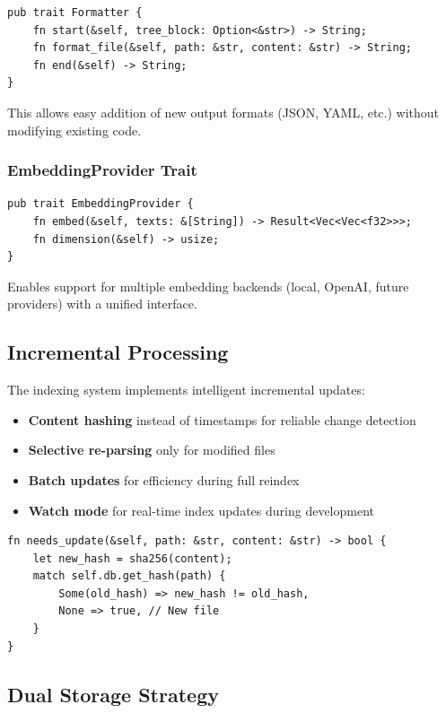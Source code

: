 \begin{lstlisting}[style=rustcode]
pub trait Formatter {
    fn start(&self, tree_block: Option<&str>) -> String;
    fn format_file(&self, path: &str, content: &str) -> String;
    fn end(&self) -> String;
}
\end{lstlisting}

This allows easy addition of new output formats (JSON, YAML, etc.) without modifying existing code.

\subsubsection{EmbeddingProvider Trait}

\begin{lstlisting}[style=rustcode]
pub trait EmbeddingProvider {
    fn embed(&self, texts: &[String]) -> Result<Vec<Vec<f32>>>;
    fn dimension(&self) -> usize;
}
\end{lstlisting}

Enables support for multiple embedding backends (local, OpenAI, future providers) with a unified interface.

\subsection{Incremental Processing}

The indexing system implements intelligent incremental updates:

\begin{itemize}
    \item \textbf{Content hashing} instead of timestamps for reliable change detection
    \item \textbf{Selective re-parsing} only for modified files
    \item \textbf{Batch updates} for efficiency during full reindex
    \item \textbf{Watch mode} for real-time index updates during development
\end{itemize}

\begin{lstlisting}[style=rustcode, caption={Content hash-based change detection}]
fn needs_update(&self, path: &str, content: &str) -> bool {
    let new_hash = sha256(content);
    match self.db.get_hash(path) {
        Some(old_hash) => new_hash != old_hash,
        None => true, // New file
    }
}
\end{lstlisting}

\subsection{Dual Storage Strategy}

